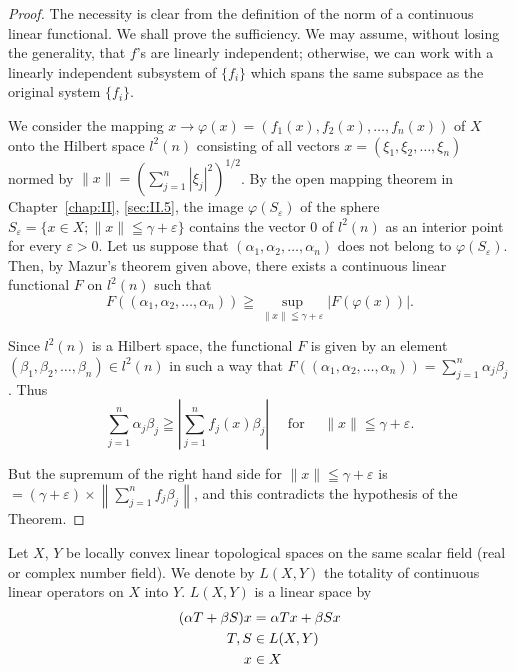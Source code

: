 \begin{proof}
 The necessity is clear from the definition of the norm of a continuous linear functional. We shall prove the sufficiency. We may assume, without losing the generality, that $f$'s are linearly independent; otherwise, we can work with a linearly independent subsystem of $\{f_i\}$ which spans the same subspace as the original system $\{f_i\}$. 


We consider the mapping $x \to \varphi(x) = (f_1(x), f_2(x), \ldots, f_n(x))$ of $X$ onto the Hilbert space $l^2(n)$ consisting of all vectors $x = (\xi_1, \xi_2, \ldots, \xi_n)$ normed by $\|x\| = \left(\sum\limits_{j=1}^{n} |\xi_j|^2\right)^{1/2}$. By the open mapping theorem in Chapter~\ref{chap:II}, \ref{sec:II.5}, the image $\varphi(S_\varepsilon)$ of the sphere $S_\varepsilon = \{x \in X; \|x\| \leqq \gamma + \varepsilon\}$ contains the vector $0$ of $l^2(n)$ as an interior point for every $\varepsilon > 0$. Let us suppose that $(\alpha_1, \alpha_2, \ldots, \alpha_n)$ does not belong to $\varphi(S_\varepsilon)$. Then, by Mazur's theorem given above, there exists a continuous linear functional $F$ on $l^2(n)$ such that 
\[
F \left(\left(\alpha_{1}, \alpha_{2}, \dots , \alpha_{n}\right)\right) \geqq \sup\limits _{\| x \| \leqq \gamma + \varepsilon} | F (\varphi (x)) |.
\]

Since $l^2(n)$ is a Hilbert space, the functional $F$ is given by an element $(\beta_1, \beta_2, \ldots, \beta_n) \in l^2(n)$ in such a way that $F((\alpha_1, \alpha_2, \ldots, \alpha_n)) = \sum\limits_{j=1}^{n} \alpha_j \beta_j$. Thus 
\[
\sum\limits_{j=1} ^{n} \alpha_{j} \beta_{j} \geqq \left| \sum\limits_{j=1} ^{n} f _{j} (x) \beta_{j} \right| \quad \text{ for } \quad \| x \| \leqq \gamma + \varepsilon .
\]

But the supremum of the right hand side for $\| x \| \leqq \gamma + \varepsilon$ is $= (\gamma + \varepsilon) \times \left\| \sum\limits_{j=1}^{n} f_j \beta_j \right\|$, and this contradicts the hypothesis of the Theorem.
\end{proof}

\label{sec:IV.7}

Let $X$, $Y$ be locally convex linear topological spaces on the same scalar field (real or complex number field). We denote by $L(X, Y)$ the totality of continuous linear operators on $X$ into $Y$. $L(X, Y)$ is a linear space by 
\begin{align}
(\alpha T + \beta S) x& = \alpha T x + \beta S x \notag \\
T, S& \in L (X, Y) \notag \\
x& \in X \notag
\end{align}

